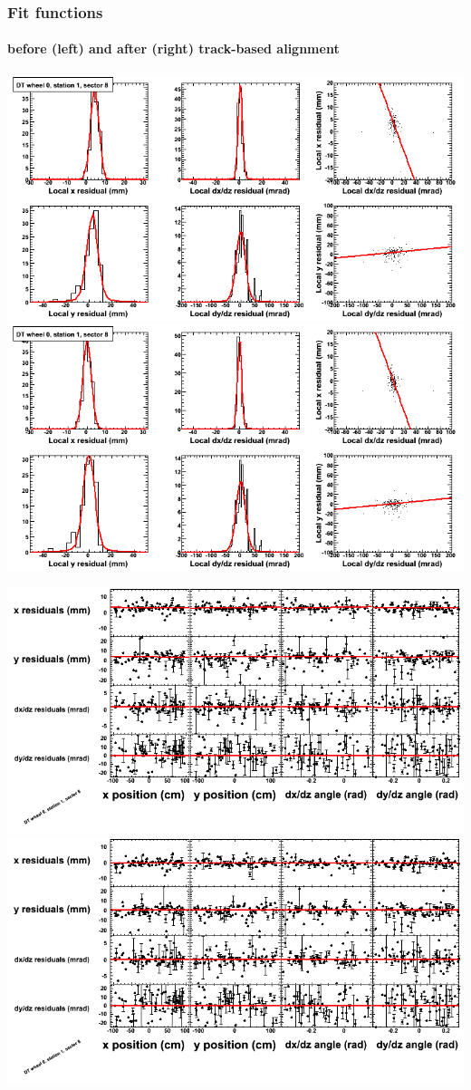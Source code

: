 \documentclass[compress]{beamer}
\begin{document}
\begin{frame}
\frametitle{Fit functions}
\framesubtitle{before (left) and after (right) track-based alignment}
\includegraphics[width=0.5\linewidth]{fitfunctions_re01/MBwhCst1sec08_bellcurves.png} \includegraphics[width=0.5\linewidth]{fitfunctions_re05/MBwhCst1sec08_bellcurves.png}

\includegraphics[width=0.5\linewidth]{fitfunctions_re01/MBwhCst1sec08_polynomials.png} \includegraphics[width=0.5\linewidth]{fitfunctions_re05/MBwhCst1sec08_polynomials.png}
\end{frame}
\end{document}
